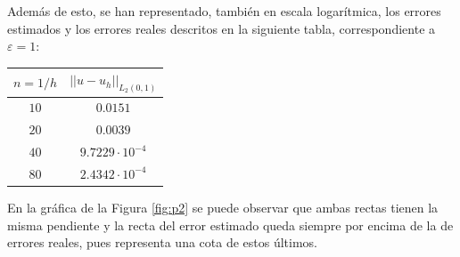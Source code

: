 \documentclass[spanish]{mathnotes}
\begin{document}
	\newpage
	Además de esto, se han representado, también en escala logarítmica, los errores estimados y los errores reales descritos en la siguiente tabla, correspondiente a $\varepsilon = 1$:
	\begin{center}
		\begin{tabular}{|c|c|}
			\hline
			\rowcolor[HTML]{EFEFEF} 
			\textbf{$n=1/h$} & \textbf{$||u-u_h||_{L_2(0,1)}$} \\ \hline
			$10$             & $0.0151$                        \\ \hline
			$20$             & $0.0039$                        \\ \hline
			$40$             & $9.7229\cdot 10^{-4}$           \\ \hline
			$80$             & $2.4342\cdot 10^{-4}$           \\ \hline
		\end{tabular}
	\end{center}
	En la gráfica de la Figura \ref{fig:p2} se puede observar que ambas rectas tienen la misma pendiente y la recta del error estimado queda siempre por encima de la de errores reales, pues representa una cota de estos últimos.
\end{document}
